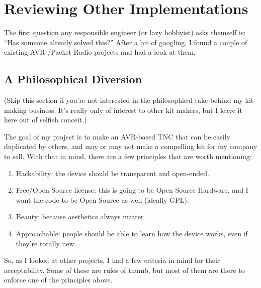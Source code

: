 \chapter{Reviewing Other Implementations}

The first question any responsible engineer (or lazy hobbyist) asks
themself is: ``Has someone already solved this?''  After a bit of
googling, I found a couple of existing AVR \aprs /Packet Radio
projects and had a look at them.

\section{A Philosophical Diversion}

(Skip this section if you're not interested in the philosophical take
behind my kit-making business.  It's really only of interest to other
kit makers, but I leave it here out of selfish conceit.)

The goal of my project is to make an AVR-based TNC that can be easily
duplicated by others, and may or may not make a compelling kit for my
company to sell.  With that in mind, there are a few principles that
are worth mentioning:

\begin{enumerate}
\item Hackability: the device should be transparent and open-ended.
\item Free/Open Source license: this is going to be Open Source Hardware,
  and I want the code to be Open Source as well (ideally GPL).
\item Beauty: because aesthetics always matter
\item Approachable: people should be able to learn how the device
  works, even if they're totally new
\end{enumerate}

So, as I looked at other projects, I had a few criteria in mind for
their acceptability.  Some of these are rules of thumb, but most of
them are there to enforce one of the principles above.

